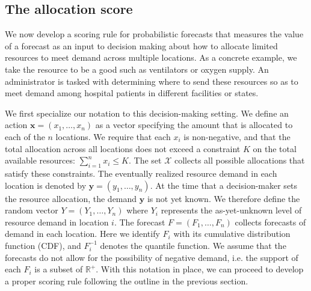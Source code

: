 \documentclass{article}
\begin{document}

\subsection{The allocation score}

We now develop a scoring rule for probabilistic forecasts that measures the value of a forecast as an input to decision making about how to allocate limited resources to meet demand across multiple locations. As a concrete example, we take the resource to be a good such as ventilators or oxygen supply. An administrator is tasked with determining where to send these resources so as to meet demand among hospital patients in different facilities or states.

We first specialize our notation to this decision-making setting. We define an action $\mathbf{x} = (x_1, \ldots, x_n)$ as a vector specifying the amount that is allocated to each of the $n$ locations. We require that each $x_i$ is non-negative, and that the total allocation across all locations does not exceed a constraint $K$ on the total available resources: $\sum_{i=1}^n x_i \leq K$. The set $\mathcal{X}$ collects all possible allocations that satisfy these constraints. The eventually realized resource demand in each location is denoted by $\mathbf{y} = (y_1, \ldots, y_n)$. At the time that a decision-maker sets the resource allocation, the demand $\mathbf{y}$ is not yet known. We therefore define the random vector $Y = (Y_1, \ldots, Y_n)$ where $Y_i$ represents the as-yet-unknown level of resource demand in location $i$. The forecast $F = (F_1, \ldots, F_n)$ collects forecasts of demand in each location. Here we identify $F_i$ with its cumulative distribution function (CDF), and $F_i^{-1}$ denotes the quantile function. We assume that the forecasts do not allow for the possibility of negative demand, i.e. the support of each $F_i$ is a subset of $\mathbb{R}^+$. With this notation in place, we can proceed to develop a proper scoring rule following the outline in the previous section.
\end{document}
